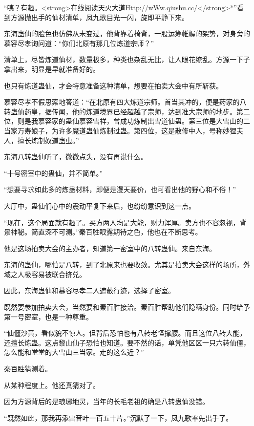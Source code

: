 
\begin{this_body}

“咦？有趣。<strong>在线阅读天火大道Http://wWw.qiushu.cc/</strong>*”看到方源抛出手的仙材清单，凤九歌目光一闪，旋即平静下来。

东海蛊仙的脸色也仿佛从未变过，他背靠着椅背，一股运筹帷幄的架势，对身旁的慕容尽孝询问道：“你们北原有那几位炼道宗师？”

清单上，尽皆炼道仙材，数量极多，种类也杂乱无比，让人眼花缭乱。方源一下子拿出来，明显是早就准备好的。

也只有炼道蛊仙，才会特意准备这种清单，想要在拍卖大会中有所斩获。

慕容尽孝不假思索地答道：“在北原有四大炼道宗师。首当其冲的，便是药家的八转蛊仙药皇，据传闻，他的炼道境界已经超越了宗师，达到准大宗师的地步。第二位，则是我慕容家的蛊仙慕容雪祥，曾成功炼制出雪道仙蛊。第三位是大雪山的二当家万寿娘子，为许多魔道蛊仙炼制过蛊。第四位，这是散修中人，号称妙狸夫人，擅长炼制奴道蛊虫。”

东海八转蛊仙听了，微微点头，没有再说什么。

“十号密室中的蛊仙，并不简单。”

“想要寻求如此多的炼蛊材料，即便是漫天要价，也可看出他的野心和不俗！”

大厅中，蛊仙们心中的震动平复下来后，也纷纷意识到这一点。

“现在，这个局面就有趣了。买方两人均是大能，财力浑厚。卖方也不容忽视，背景神秘。简直深不可测。”秦百胜眼露期待之色，他也在不断思考。

他是这场拍卖大会的主办者，知道第一密室中的八转蛊仙。来自东海。

东海的蛊仙，哪怕是八转，到了北原来也要收敛。尤其是拍卖大会这样的场所，外域之人极容易被联合挤兑。

因此，东海蛊仙和慕容尽孝二人遮蔽行迹，选择了密室。

既然要参加拍卖大会，当然要和秦百胜接洽。秦百胜帮助他们隐瞒身份。同时给予第一号密室，也是一种尊重。

“仙僵沙黄，看似貌不惊人。但背后恐怕也有八转老怪撑腰。而且这位八转大能，还擅长炼蛊。这点黎山仙子恐怕也知道。要不然的话，单凭他区区一只六转仙僵，怎么能和堂堂的大雪山三当家。走的这么近？”

秦百胜猜测着。

从某种程度上。他还真猜对了。

因为方源背后的是琅琊地灵，当年的长毛老祖的确是八转蛊仙没错。

“既然如此，那我再添雷音叶一百五十片。”沉默了一下，凤九歌率先出手了。


\end{this_body}
